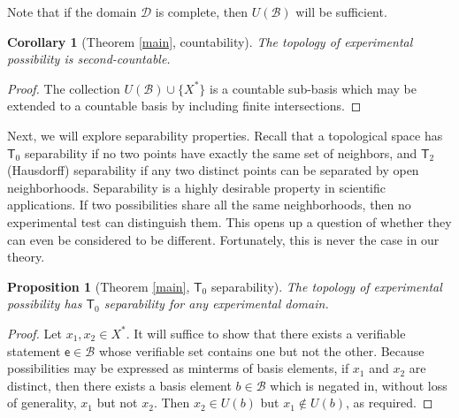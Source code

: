 \documentclass[psamsfonts]{amsart}
\newtheorem{cor}[thm]{Corollary}
\newtheorem{prop}[thm]{Proposition}
\theoremstyle{definition}
\theoremstyle{remark}
\numberwithin{equation}{section}
\newcommand{\edomain}[1][D] {\mathcal{#1}}
\newcommand{\basis}[1][B] {\mathcal{#1}} %
\begin{document}
Note that if the domain $\edomain$ is complete, then $U(\basis)$ will be sufficient. 

\begin{cor}[Theorem \ref{main}, countability]
The topology of experimental possibility is second-countable.
\end{cor}
\begin{proof}
The collection $U(\basis)\cup\{X^*\}$ is a countable sub-basis which may be extended to a countable basis by including finite intersections. 
\end{proof}


Next, we will explore separability properties. Recall that a topological space has $\mathsf{T}_0$ separability if no two points have exactly the same set of neighbors, and $\mathsf{T}_2$ (Hausdorff) separability if any two distinct points can be separated by open neighborhoods. Separability is a highly desirable property in scientific applications. If two possibilities share all the same neighborhoods, then no experimental test can distinguish them. This opens up a question of whether they can even be considered to be different. Fortunately, this is never the case in our theory. 

\begin{prop}[Theorem \ref{main}, $\mathsf{T}_0$ separability]
The topology of experimental possibility has $\mathsf{T}_0$ separability for any experimental domain. 
\end{prop}
\begin{proof}
Let $x_1,x_2\in X^*$. It will suffice to show that there exists a verifiable statement $\mathsf{e}\in\basis$ whose verifiable set contains one but not the other. Because possibilities may be expressed as minterms of basis elements, if $x_1$ and $x_2$ are distinct, then there exists a basis element $b\in\basis$ which is negated in, without loss of generality, $x_1$ but not $x_2$. Then $x_2\in U(b)$ but $x_1\notin U(b)$, as required. 
\end{proof}
\end{document}
